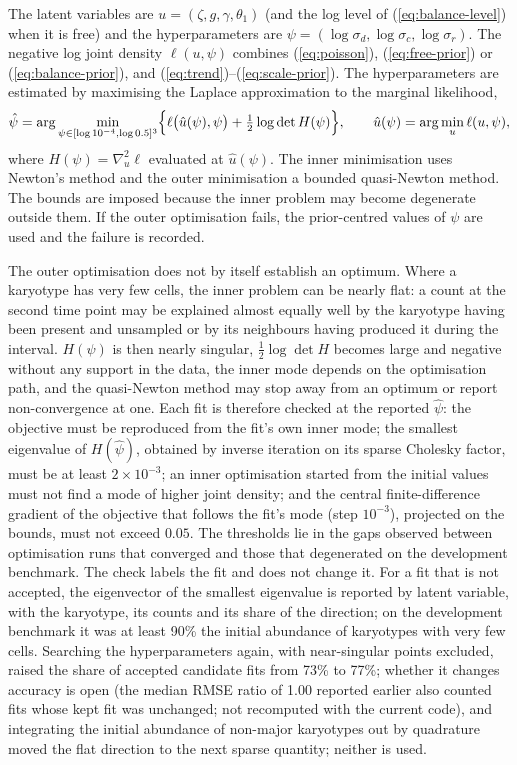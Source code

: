 \documentclass[11pt]{article}
\begin{document}
The latent variables are $u=(\zeta,g,\gamma,\theta_1)$ (and the log level
of (\ref{eq:balance-level}) when it is free) and the
hyperparameters are $\psi=(\log\sigma_d,\log\sigma_c,\log\sigma_r)$. The
negative log joint density $\ell(u,\psi)$ combines (\ref{eq:poisson}),
(\ref{eq:free-prior}) or (\ref{eq:balance-prior}), and
(\ref{eq:trend})--(\ref{eq:scale-prior}). The hyperparameters are estimated
by maximising the Laplace approximation to the marginal likelihood,
\begin{equation}
  \hat\psi=\arg\min_{\psi\in[\log10^{-4},\log0.5]^3}
  \Bigl\{\ell\bigl(\hat u(\psi),\psi\bigr)+\tfrac12\log\det H(\psi)\Bigr\},
  \qquad
  \hat u(\psi)=\arg\min_u\ell(u,\psi),
  \label{eq:laplace}
\end{equation}
where $H(\psi)=\nabla_u^2\ell$ evaluated at $\hat u(\psi)$. The inner
minimisation uses Newton's method and the outer minimisation a bounded
quasi-Newton method. The bounds are imposed because the inner problem may
become degenerate outside them. If the outer optimisation fails, the
prior-centred values of $\psi$ are used and the failure is recorded.

The outer optimisation does not by itself establish an optimum. Where a
karyotype has very few cells, the inner problem can be nearly flat: a count at
the second time point may be explained almost equally well by the karyotype having
been present and unsampled or by its neighbours having produced it during the
interval. $H(\psi)$ is then nearly singular, $\tfrac12\log\det H$ becomes
large and negative without any support in the data, the inner mode depends on
the optimisation path, and the quasi-Newton method may stop away from an
optimum or report non-convergence at one. Each fit is therefore checked at
the reported $\hat\psi$: the objective must be reproduced from the fit's own
inner mode; the smallest eigenvalue of $H(\hat\psi)$, obtained by inverse
iteration on its sparse Cholesky factor, must be at least $2\times10^{-3}$;
an inner optimisation started from the initial values must not find a mode of
higher joint density; and the central finite-difference gradient of the
objective that follows the fit's mode (step $10^{-3}$), projected on the
bounds, must not exceed $0.05$. The thresholds lie in the gaps observed
between optimisation runs that converged and those that degenerated on the
development benchmark. The check labels the fit and does not change it. For
a fit that is not accepted, the eigenvector of the smallest eigenvalue is
reported by latent variable, with the karyotype, its counts and its share of
the direction; on the development benchmark it was at least 90\% the initial
abundance of karyotypes with very few cells. Searching the hyperparameters
again, with near-singular points excluded, raised the share of accepted
candidate fits from 73\% to 77\%; whether it changes accuracy is open (the
median RMSE ratio of 1.00 reported earlier also counted fits whose kept fit
was unchanged; not recomputed with the current code), and integrating the initial abundance of non-major karyotypes out by
quadrature moved the flat direction to the next sparse quantity; neither is
used.
\end{document}
